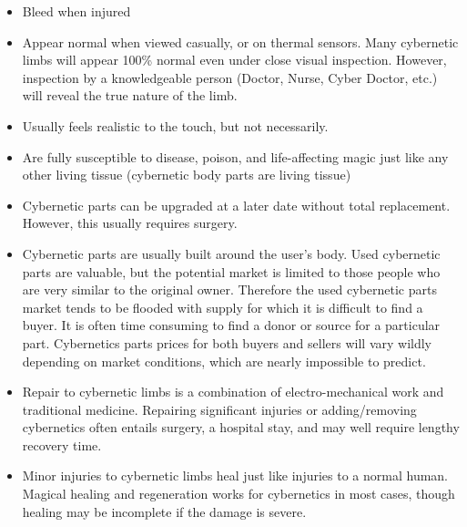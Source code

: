 \documentclass[twoside]{book}
\begin{document}
\begin{itemize}
      
  \item   Bleed when injured 
  \item   Appear normal when viewed casually, or on thermal
                 sensors. Many cybernetic limbs will appear 100\% normal
                 even under close visual inspection. However, inspection
                 by a knowledgeable person (Doctor, Nurse, Cyber Doctor,
                 etc.) will reveal the true nature of the limb. 
  \item   Usually feels realistic to the touch, but not
                 necessarily. 
  \item   Are fully susceptible to disease, poison, and
                 life-affecting magic just like any other living tissue
                 (cybernetic body parts are living tissue) 
  \item   Cybernetic parts can be upgraded at a later date
                 without total replacement. However, this usually
                 requires surgery. 
  \item   Cybernetic parts are usually built around the
                 user's body. Used cybernetic parts are valuable,
                 but the potential market is limited to those people who
                 are very similar to the original owner. Therefore the
                 used cybernetic parts market tends to be flooded with
                 supply for which it is difficult to find a buyer. It is
                 often time consuming to find a donor or source for a
                 particular part. Cybernetics parts prices for both
                 buyers and sellers will vary wildly depending on market
                 conditions, which are nearly impossible to predict.
                 
  \item   Repair to cybernetic limbs is a combination of
                 electro-mechanical work and traditional medicine.
                 Repairing significant injuries or adding/removing
                 cybernetics often entails surgery, a hospital stay, and
                 may well require lengthy recovery time. 
  \item   Minor injuries to cybernetic limbs heal just like
                 injuries to a normal human. Magical healing and
                 regeneration works for cybernetics in most cases, though
                 healing may be incomplete if the damage is severe.
                 
\end{itemize}
  
\end{document}
